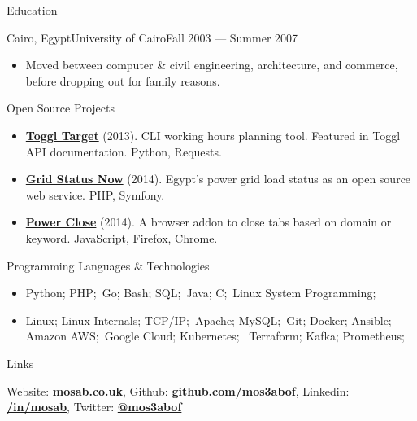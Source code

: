 \documentclass[]{mosabcv}
\begin{document}
\begin{cvsection}{Education}
  \begin{cvsubsection}{Cairo, Egypt}{University of Cairo}{Fall 2003 --- Summer 2007}
    \begin{itemize}
      \item Moved between computer \& civil engineering, architecture,
        and commerce, before dropping out for family reasons.
    \end{itemize}
  \end{cvsubsection}
\end{cvsection}

\begin{cvsection}{Open Source Projects}
  \begin{cvsubsection}{}{}{}
    \begin{itemize}
      \item \textbf{\href{https://github.com/mos3abof/toggl_target}{Toggl
        Target}} (2013). CLI working hours planning tool. Featured in Toggl API
        documentation. Python, Requests.
      \item \textbf{\href{https://www.gridstatusnow.com}{Grid Status Now}}
        (2014). Egypt's power grid load status as an open source web service.
        PHP, Symfony.
      \item \textbf{\href{https://power-close.com/}{Power Close}} (2014). A
        browser addon to close tabs based on domain or keyword. JavaScript,
        Firefox, Chrome.
    \end{itemize}
  \end{cvsubsection}
\end{cvsection}

\begin{cvsection}{Programming Languages \& Technologies}
  \begin{cvsubsection}{}{}{}
    \begin{itemize}
      \item Python; PHP;\ Go; Bash; SQL;\ Java; C;\ Linux System Programming;
      \item Linux; Linux Internals; TCP/IP;\ Apache; MySQL;\ Git; Docker;
        Ansible; Amazon AWS;\ Google Cloud; Kubernetes; \ Terraform; Kafka;
        Prometheus;
    \end{itemize}
  \end{cvsubsection}
\end{cvsection}

\begin{cvsection}{Links}
  \begin{cvsubsection}{}{}{}
      Website:
       \textbf{\href{https://mosab.co.uk}{mosab.co.uk}},
      Github:
       \textbf{\href{https://github.com/mos3abof}{github.com/mos3abof}},
      Linkedin:
        \textbf{\href{https://linkedin.com/in/mosab}{/in/mosab}},
      Twitter:
        \textbf{\href{https://twitter.com/mos3abof}{@mos3abof}}
  \end{cvsubsection}
\end{cvsection}
\end{document}
